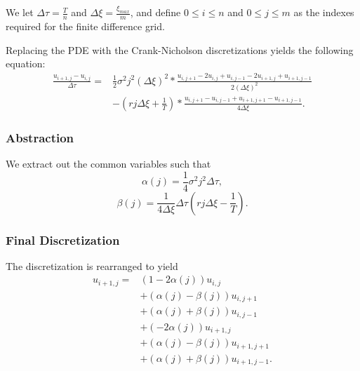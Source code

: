 \documentclass{beamer}
\begin{document}
  \begin{frame}
    We let \(\Delta\tau = \frac{T}{n}\) and \(\Delta\xi = \frac{\xi_{max}}{m}\), and define \(0 \le i \le n\) and \(0 \le j \le m\) as the indexes required for the finite difference grid.

    Replacing the PDE with the Crank-Nicholson discretizations yields the following equation:
    \begin{equation}
      \begin{split}
        \frac{u_{i+1, j} - u_{i, j}}{\Delta\tau} = & \frac{1}{2}\sigma^2j^2(\Delta\xi)^2 * \frac{u_{i, j+1} - 2u_{i, j} + u_{i, j-1} -2u_{i+1, j} + u_{i+1, j-1}}{2(\Delta\xi)^2} \\ & - (rj\Delta\xi + \frac{1}{T}) * \frac{u_{i, j+1} - u_{i,j-1} +u_{i+1, j+1} - u_{i+1, j-1}}{4\Delta\xi}.
      \end{split}
    \end{equation}
  \end{frame}

  \begin{frame}
    \frametitle{Abstraction}
    We extract out the common variables such that
    \begin{equation}
      \alpha(j) = \frac{1}{4}\sigma^2j^2\Delta\tau,
    \end{equation}
    \begin{equation}
      \beta(j) = \frac{1}{4\Delta\xi}\Delta\tau(rj\Delta\xi - \frac{1}{T}).
    \end{equation}
  \end{frame}

  \begin{frame}
    \frametitle{Final Discretization}
    The discretization is rearranged to yield
    \begin{equation}
      \begin{split}
        u_{i+1, j} = & (1-2\alpha(j))u_{i, j} \\
        & + (\alpha(j)-\beta(j))u_{i, j+1}\\
        & + (\alpha(j)+\beta(j))u_{i, j-1}\\
        & + (-2\alpha(j))u_{i+1, j}\\
        & + (\alpha(j)-\beta(j))u_{i+1, j+1}\\
        & + (\alpha(j)+\beta(j))u_{i+1, j-1}.
      \end{split}
    \end{equation}
  \end{frame}
\end{document}
